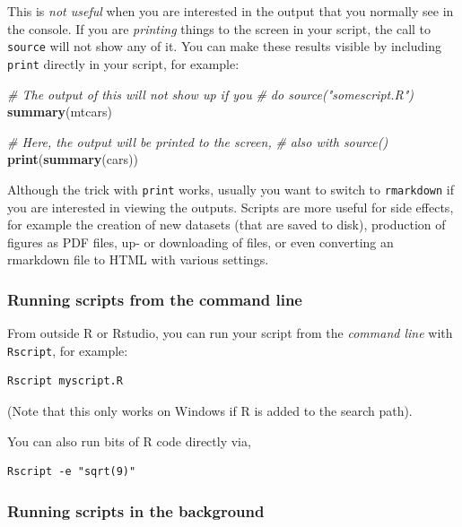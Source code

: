 \documentclass[]{book}
\newenvironment{Shaded}{\begin{snugshade}}{\end{snugshade}}
\newcommand{\CommentTok}[1]{\textcolor[rgb]{0.56,0.35,0.01}{\textit{#1}}}
\newcommand{\KeywordTok}[1]{\textcolor[rgb]{0.13,0.29,0.53}{\textbf{#1}}}
\newcommand{\NormalTok}[1]{#1}
\begin{document}
This is \emph{not useful} when you are interested in the output that you normally see in the console. If you are \emph{printing} things to the screen in your script, the call to \texttt{source} will not show any of it. You can make these results visible by including \texttt{print} directly in your script, for example:

\begin{Shaded}
\begin{Highlighting}[]
\CommentTok{# The output of this will not show up if you }
\CommentTok{# do source("somescript.R")}
\KeywordTok{summary}\NormalTok{(mtcars)}

\CommentTok{# Here, the output will be printed to the screen,}
\CommentTok{# also with source()}
\KeywordTok{print}\NormalTok{(}\KeywordTok{summary}\NormalTok{(cars))}
\end{Highlighting}
\end{Shaded}

Although the trick with \texttt{print} works, usually you want to switch to \texttt{rmarkdown} if you are interested in viewing the outputs. Scripts are more useful for side effects, for example the creation of new datasets (that are saved to disk), production of figures as PDF files, up- or downloading of files, or even converting an rmarkdown file to HTML with various settings.

\hypertarget{running-scripts-from-the-command-line}{%
\subsubsection{Running scripts from the command line}\label{running-scripts-from-the-command-line}}

From outside R or Rstudio, you can run your script from the \emph{command line} with \texttt{Rscript}, for example:

\begin{verbatim}
Rscript myscript.R
\end{verbatim}

(Note that this only works on Windows if R is added to the search path).

You can also run bits of R code directly via,

\begin{verbatim}
Rscript -e "sqrt(9)"
\end{verbatim}

\hypertarget{running-scripts-in-the-background}{%
\subsubsection{Running scripts in the background}\label{running-scripts-in-the-background}}
\end{document}
